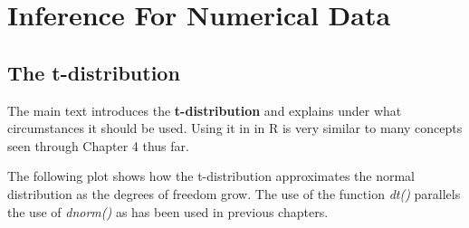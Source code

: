 \documentclass{report}\usepackage[]{graphicx}\usepackage[]{color}
\begin{document}
\newpage
\chapter{Inference For Numerical Data}
\minitoc

\vspace{0.5cm} 

\section{The t-distribution}
The main text introduces the \textbf{t-distribution} and explains under what circumstances it should be used.  Using it in in R is very similar to many concepts seen through Chapter 4 thus far.  

The following plot shows how the t-distribution approximates the normal distribution as the degrees of freedom grow.  The use of the function \textit{dt()} parallels the use of \textit{dnorm()} as has been used in previous chapters.  
\end{document}
